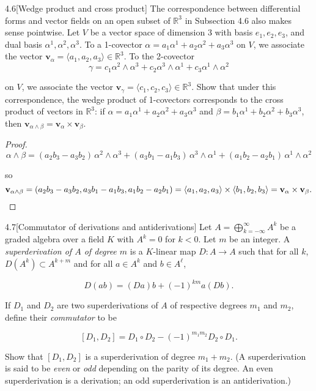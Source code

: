 \begin{problem}{4.6}[Wedge product and cross product]
The correspondence between differential forms and vector fields on an open subset of \(\mathbb{R}^{3}\) in Subsection 4.6 also makes sense pointwise. Let \(V\) be a vector space of dimension 3 with basis \(e_{1}, e_{2}, e_{3}\), and dual basis \(\alpha^{1}, \alpha^{2}, \alpha^{3}\). To a 1-covector \(\alpha = a_{1} \alpha^{1} + a_{2} \alpha^{2} + a_{3} \alpha^{3}\) on \(V\), we associate the vector \(\mathbf{v}_{\alpha} = \langle a_{1}, a_{2}, a_{3} \rangle \in \mathbb{R}^{3}\). To the 2-covector
\[
	\gamma = c_{1} \alpha^{2} \wedge \alpha^{3} + c_{2} \alpha^{3} \wedge \alpha^{1} + c_{3} \alpha^{1} \wedge \alpha^{2}
\]

on \(V\), we associate the vector \(\mathbf{v}_{\gamma} = \langle c_{1}, c_{2}, c_{3} \rangle \in \mathbb{R}^{3}\). Show that under this correspondence, the wedge product of 1-covectors corresponds to the cross product of vectors in \(\mathbb{R}^{3}\): if \(\alpha = a_{1} \alpha^{1} + a_{2} \alpha^{2} + a_{3} \alpha^{3}\) and \(\beta = b_{1} \alpha^{1} + b_{2} \alpha^{2} + b_{3} \alpha^{3}\), then \(\mathbf{v}_{\alpha \wedge \beta} = \mathbf{v}_{\alpha} \times \mathbf{v}_{\beta}\).
\end{problem}

\begin{proof}
	\[ \alpha \wedge \beta = (a_{2}b_{3} - a_{3}b_{2})\, \alpha^{2} \wedge \alpha^{3} + (a_{3}b_{1} - a_{1}b_{3})\, \alpha^{3}\wedge \alpha^{1} + (a_{1}b_{2} - a_{2}b_{1})\, \alpha^{1} \wedge \alpha^{2} \]

	so
	\[
		\mathbf{v}_{\alpha\wedge \beta} = (a_{2}b_{3} - a_{3}b_{2}, a_{3}b_{1} - a_{1}b_{3}, a_{1}b_{2} - a_{2}b_{1}) = \left\langle{a_{1}, a_{2}, a_{3}}\right\rangle \times \left\langle{b_{1}, b_{2}, b_{3}}\right\rangle = \mathbf{v}_{\alpha} \times \mathbf{v}_{\beta}.\qedhere
	\]
\end{proof}

\begin{problem}{4.7}[Commutator of derivations and antiderivations]
Let \(A = \bigoplus_{k=-\infty}^{\infty} A^{k}\) be a graded algebra over a field \(K\) with \(A^{k} = 0\) for \(k < 0\). Let \(m\) be an integer. A \textit{superderivation of \(A\) of degree \(m\)} is a \(K\)-linear map \(D\colon A \to A\) such that for all \(k\), \(D(A^{k}) \subset A^{k+m}\) and for all \(a \in A^{k}\) and \(b \in A^{\ell}\),

\[
	D(ab) = (Da)b + {(-1)}^{km} a(Db).
\]

If \(D_{1}\) and \(D_{2}\) are two superderivations of \(A\) of respective degrees \(m_{1}\) and \(m_{2}\), define their \textit{commutator} to be

\[
	[D_{1}, D_{2}] = D_{1} \circ D_{2} - {(-1)}^{m_{1} m_{2}} D_{2} \circ D_{1}.
\]

Show that \([D_{1}, D_{2}]\) is a superderivation of degree \(m_{1} + m_{2}\). (A superderivation is said to be \textit{even} or \textit{odd} depending on the parity of its degree. An even superderivation is a derivation; an odd superderivation is an antiderivation.)
\end{problem}

